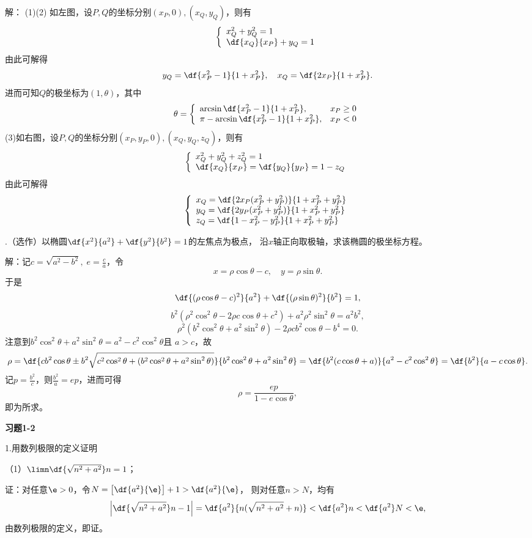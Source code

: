 解：
(1)(2) 如左图，设$P,Q$的坐标分别$(x_P,0),(x_Q,y_Q)$，则有
$$
\left\{
\begin{array}{l}
	x^2_Q+y^2_Q=1\\
	\df{x_Q}{x_P}+y_Q=1
\end{array}
\right.
$$
由此可解得
$$y_Q=\df{x^2_P-1}{1+x^2_P},\quad x_Q=\df{2x_P}{1+x^2_P}.$$
进而可知$Q$的极坐标为$(1,\theta)$，其中
$$\theta=
\left\{
\begin{array}{ll}
	\arcsin\df{x^2_P-1}{1+x^2_P},& x_P\geq 0\\
	\pi-\arcsin\df{x^2_P-1}{1+x^2_P}, & x_P<0
\end{array}
\right.
$$
(3)如右图，设$P,Q$的坐标分别$(x_P,y_P,0),(x_Q,y_Q,z_Q)$，则有
$$
\left\{
\begin{array}{l}
	x^2_Q+y^2_Q+z^2_Q=1\\
	\df{x_Q}{x_P}=\df{y_Q}{y_P}=1-z_Q
\end{array}
\right.
$$
由此可解得
$$
\left\{
\begin{array}{l}
	x_Q=\df{2x_P(x^2_P+y^2_P)}{1+x^2_P+y^2_P}\\
	y_Q=\df{2y_P(x^2_P+y^2_P)}{1+x^2_P+y^2_P}\\
	z_Q=\df{1-x^2_P-y^2_P}{1+x^2_P+y^2_P}
\end{array}
\right.
$$
\fin

.（选作）以椭圆$\df{x^2}{a^2}+\df{y^2}{b^2}=1$的左焦点为极点，
沿$x$轴正向取极轴，求该椭圆的极坐标方程。

解：记$c=\sqrt{a^2-b^2},\;e=\frac ca$，令
$$x=\rho\cos\theta-c,\quad y=\rho\sin\theta.$$
于是
$$\df{(\rho\cos\theta-c)^2}{a^2}+\df{(\rho\sin\theta)^2}{b^2}=1,$$
$$b^2(\rho^2\cos^2\theta-2\rho c\cos\theta+c^2)
+a^2\rho^2\sin^2\theta=a^2b^2,$$
$$\rho^2(b^2\cos^2\theta+a^2\sin^2\theta)-2\rho cb^2\cos\theta-b^4=0.$$
注意到$b^2\cos^2\theta+a^2\sin^2\theta=a^2-c^2\cos^2\theta$且
$a>c$，故
$$\rho=\df{cb^2\cos\theta\pm b^2\sqrt{c^2\cos^2\theta
+(b^2\cos^2\theta+a^2\sin^2\theta)}}{b^2\cos^2\theta
+a^2\sin^2\theta}=\df{b^2(c\cos\theta+a)}{a^2-c^2\cos^2\theta}
=\df{b^2}{a-c\cos\theta}.$$
记$p=\frac{b^2}{c}$，则$\frac{b^2}{a}=ep$，进而可得
$$\rho=\frac{ep}{1-e\cos\theta},$$
即为所求。\fin

\newpage

\begin{center}
	\bf 习题1-2
\end{center}

1.用数列极限的定义证明

（1）$\limn\df{\sqrt{n^2+a^2}}n=1$；

证：对任意$\e>0$，令$N=\left[\df{a^2}{\e}\right]+1>\df{a^2}{\e}$，
则对任意$n>N$，均有
$$\left|\df{\sqrt{n^2+a^2}}n-1\right|
=\df{a^2}{n(\sqrt{n^2+a^2}+n)}<\df{a^2}n<\df{a^2}N<\e,
$$
由数列极限的定义，即证。\fin

